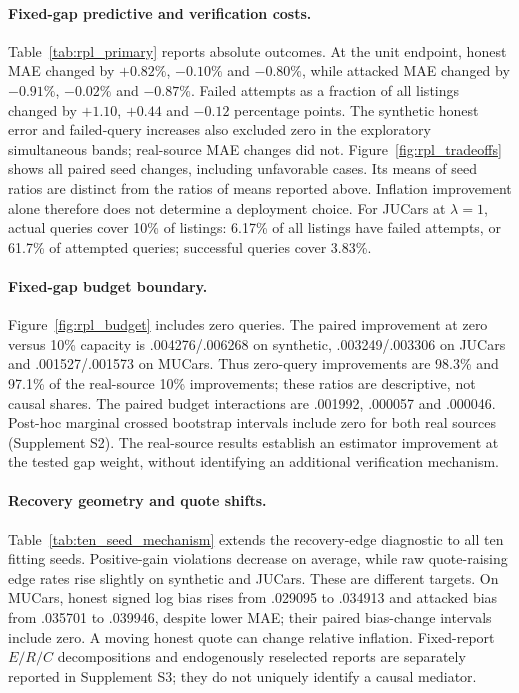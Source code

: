 \documentclass[11pt]{article}
\begin{document}
\paragraph{Fixed-gap predictive and verification costs.}
Table~\ref{tab:rpl_primary} reports absolute outcomes. At the unit endpoint,
honest MAE changed by $+0.82\%$, $-0.10\%$ and $-0.80\%$, while attacked MAE
changed by $-0.91\%$, $-0.02\%$ and $-0.87\%$. Failed attempts as a fraction of all listings
changed by $+1.10$, $+0.44$ and $-0.12$ percentage points. The synthetic honest
error and failed-query increases also excluded zero in the exploratory
simultaneous bands; real-source MAE changes did not. Figure~\ref{fig:rpl_tradeoffs}
shows all paired seed changes, including unfavorable cases. Its means of seed
ratios are distinct from the ratios of means reported above. Inflation
improvement alone therefore does not determine a deployment choice. For JUCars at $\lambda=1$, actual queries cover 10\% of listings: 6.17\% of all listings have failed attempts, or 61.7\% of attempted queries; successful queries cover 3.83\%.

\paragraph{Fixed-gap budget boundary.}
Figure~\ref{fig:rpl_budget} includes zero queries. The paired improvement
at zero versus 10\% capacity is .004276/.006268 on synthetic,
.003249/.003306 on JUCars and .001527/.001573 on MUCars. Thus zero-query
improvements are 98.3\% and 97.1\% of the real-source 10\% improvements;
these ratios are descriptive, not causal shares. The paired budget
interactions are .001992, .000057 and .000046. Post-hoc marginal crossed
bootstrap intervals include zero for both real sources (Supplement S2).
The real-source results establish an estimator improvement at the tested
gap weight, without identifying an additional verification mechanism.

\paragraph{Recovery geometry and quote shifts.}
Table~\ref{tab:ten_seed_mechanism} extends the recovery-edge diagnostic to
all ten fitting seeds. Positive-gain violations decrease on average, while
raw quote-raising edge rates rise slightly on synthetic and JUCars. These
are different targets. On MUCars, honest signed log bias rises from .029095
to .034913 and attacked bias from .035701 to .039946, despite lower MAE;
their paired bias-change intervals include zero. A moving honest quote can
change relative inflation. Fixed-report $E/R/C$ decompositions and
endogenously reselected reports are separately reported in Supplement S3;
they do not uniquely identify a causal mediator.
\end{document}
